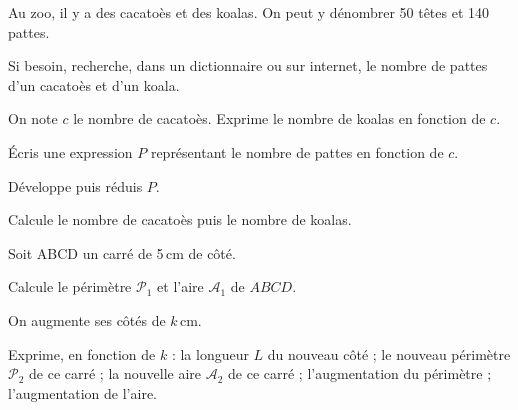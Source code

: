 \begin{exercice}[Au zoo]
Au zoo, il y a des cacatoès et des koalas. On peut y dénombrer 50 têtes et 140 pattes.

\begin{colenumerate}{1} 
\item Si besoin, recherche, dans un dictionnaire ou sur internet, le nombre de pattes d'un cacatoès et d'un koala.
\item On note $c$ le nombre de cacatoès. Exprime le nombre de koalas en fonction de $c$.
\item Écris une expression $P$ représentant le nombre de pattes en fonction de $c$.
\item Développe puis réduis $P$.
\item Calcule le nombre de cacatoès puis le nombre de koalas.
\end{colenumerate} 
\end{exercice}

\begin{exercice}
Soit ABCD un carré de 5\,cm de côté. 

\begin{colenumerate}{1} 
\item Calcule le périmètre $\mathcal{P}_1$ et l'aire $\mathcal{A}_1$ de $ABCD$.
\item On augmente ses côtés de $k$\,cm. 

Exprime, en fonction de $k$ :
        \subitem la longueur $L$ du nouveau côté ;
        \subitem le nouveau périmètre $\mathcal{P}_2$ de ce carré ;
        \subitem la nouvelle aire $\mathcal{A}_2$ de ce carré ;
        \subitem l'augmentation du périmètre ;
        \subitem l'augmentation de l'aire.
\end{colenumerate}
\end{exercice}




